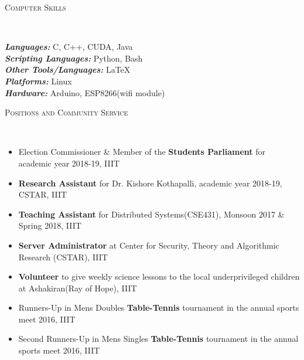 \documentclass[10pt]{article}
\newenvironment{changemargin}[2]{%
    \begin{list}{}{%
            \setlength{\topsep}{0pt}%
            \setlength{\leftmargin}{#1}%
            \setlength{\rightmargin}{#2}%
            \setlength{\listparindent}{\parindent}%
        \setlength{\itemindent}{\parindent}%
            \setlength{\parsep}{\parskip}%
        }%
\item[]}{\end{list}
}
\newcommand{\lineover}{
    \begin{changemargin}{-0.05in}{-0.10in}
        \vspace*{-8pt}
        \hrulefill \\
        \vspace*{-2pt}
    \end{changemargin}
}
\newcommand{\header}[1]{
    \begin{changemargin}{-0.75in}{-0.75in}
        \scshape{#1}\\
        \lineover
    \end{changemargin}
}
\newenvironment{body} {
    \vspace*{-16pt}
    \begin{changemargin}{-0.6in}{-0.65in}
    }     
    {\end{changemargin}
}
\begin{document}

\smallskip
\header{Computer Skills}

\begin{body}
    \vspace{14pt}
    \emph{\textbf{Languages:}}{} C, C++, CUDA, Java\\
    \emph{\textbf{Scripting Languages:}}{} Python, Bash\\
    \emph{\textbf{Other Tools/Languages:}}{} \LaTeX\\
    \emph{\textbf{Platforms:}}{} Linux\\
    \emph{\textbf{Hardware:}}{} Arduino, ESP8266(wifi module)
\end{body}

\smallskip
\header{Positions and Community Service}

\begin{body}
    \vspace{14pt}
    \begin{itemize}
        \item{Election Commissioner \& Member of the \textbf{Students Parliament} for academic year 2018-19, IIIT}
        \item{\textbf{Research Assistant} for Dr. Kishore Kothapalli, academic year 2018-19, CSTAR, IIIT}
        \item{\textbf{Teaching Assistant} for Distributed Systems(CSE431), Monsoon 2017 \& Spring 2018, IIIT}
        \item{\textbf{Server Administrator} at Center for Security, Theory and Algorithmic Research (CSTAR), IIIT}
        \item{\textbf{Volunteer} to give weekly science lessons to the local underprivileged children at Ashakiran(Ray of Hope), IIIT}
        \item{Runners-Up in Mens Doubles \textbf{Table-Tennis} tournament in the annual sports meet 2016, IIIT}
        \item{Second Runners-Up in Mens Singles \textbf{Table-Tennis} tournament in the annual sports meet 2016, IIIT}
    \end{itemize}
\end{body}
\end{document}
